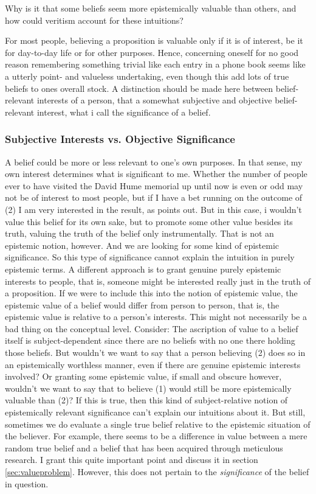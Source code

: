 \documentclass[12pt,numbers=noenddot]{scrartcl}
\begin{document}
Why is it that some beliefs seem more epistemically valuable than others, and how could veritism account for these intuitions?

For most people, believing a proposition is valuable only if it is of interest, be it for day-to-day life or for other purposes. Hence, concerning oneself for no good reason remembering something trivial like each entry in a phone book seems like a utterly point- and valueless undertaking, even though this add lots of true beliefs to ones overall stock. A distinction should be made here between belief-relevant interests of a person, that a somewhat subjective and objective belief-relevant interest, what i call the significance of a belief.

\subsubsection{Subjective Interests vs. Objective Significance}
A belief could be more or less relevant to one's own purposes. In that sense, my own interest determines what is significant to me. Whether the number of people ever to have visited the David Hume memorial up until now is even or odd may not be of interest to most people, but if I have a bet running on the outcome of (2) I am very interested in the result, as \textcite[333]{Ahlstrom-Vij2013} points out. But in this case, i wouldn't value this belief for its own sake, but to promote some other value besides its truth, valuing the truth of the belief only instrumentally. That is not an epistemic notion, however. And we are looking for some kind of epistemic significance. So this type of significance cannot explain the intuition in purely epistemic terms. A different approach is to grant genuine purely epistemic interests to people, that is, someone might be interested really just in the truth of a proposition. If we were to include this into the notion of epistemic value, the epistemic value of a belief would differ from person to person, that is, the epistemic value is relative to a person's interests. This might not necessarily be a bad thing on the conceptual level. Consider: The ascription of value to a belief itself is subject-dependent since there are no beliefs with no one there holding those beliefs. But wouldn't we want to say that a person believing (2) does so in an epistemically worthless manner, even if there are genuine epistemic interests involved? Or granting some epistemic value, if small and obscure however, wouldn't we want to say that to believe (1) would still be more epistemically  valuable than (2)? If this is true, then this kind of subject-relative notion of epistemically relevant significance can't explain our intuitions about it. But still, sometimes we do evaluate a single true belief relative to the epistemic situation of the believer. For example, there seems to be a difference in value between a mere random true belief and a belief that has been acquired through meticulous research. I grant this quite important point and discuss it in section \ref{sec:valueproblem}. However, this does not pertain to the \emph{significance} of the belief in question.
\end{document}
